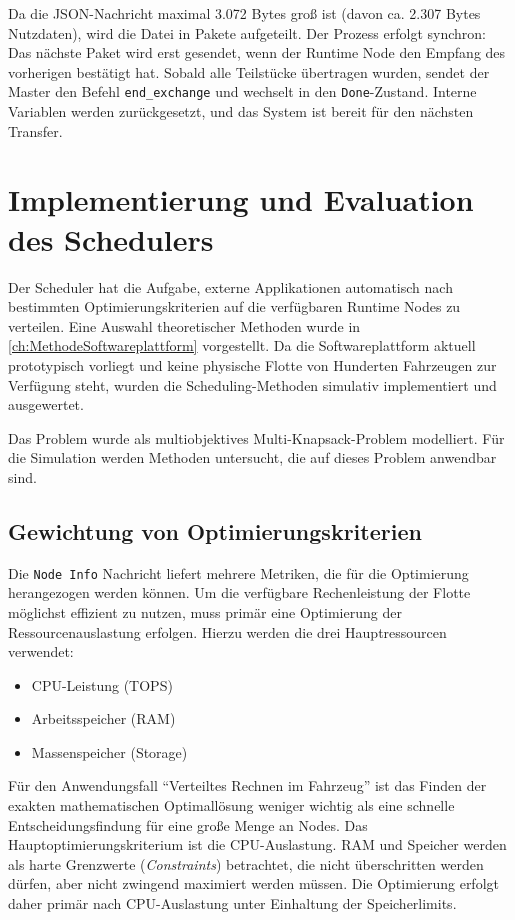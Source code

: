 Da die \gls{JSON}-Nachricht maximal 3.072 Bytes groß ist (davon ca. 2.307 Bytes Nutzdaten), wird die Datei in Pakete aufgeteilt. Der Prozess erfolgt synchron: Das nächste Paket wird erst gesendet, wenn der Runtime Node den Empfang des vorherigen bestätigt hat. Sobald alle Teilstücke übertragen wurden, sendet der Master den Befehl \texttt{end\_exchange} und wechselt in den \texttt{Done}-Zustand. Interne Variablen werden zurückgesetzt, und das System ist bereit für den nächsten Transfer.

\section{Implementierung und Evaluation des Schedulers}
\label{sec:ImplementierungScheduler}

Der Scheduler hat die Aufgabe, externe Applikationen automatisch nach bestimmten Optimierungskriterien auf die verfügbaren Runtime Nodes zu verteilen. Eine Auswahl theoretischer Methoden wurde in \autoref{ch:MethodeSoftwareplattform} vorgestellt. Da die Softwareplattform aktuell prototypisch vorliegt und keine physische Flotte von Hunderten Fahrzeugen zur Verfügung steht, wurden die Scheduling-Methoden simulativ implementiert und ausgewertet.

Das Problem wurde als multiobjektives Multi-Knapsack-Problem modelliert. Für die Simulation werden Methoden untersucht, die auf dieses Problem anwendbar sind.

\subsection{Gewichtung von Optimierungskriterien}
Die \texttt{Node Info} Nachricht liefert mehrere Metriken, die für die Optimierung herangezogen werden können. Um die verfügbare Rechenleistung der Flotte möglichst effizient zu nutzen, muss primär eine Optimierung der Ressourcenauslastung erfolgen. Hierzu werden die drei Hauptressourcen verwendet:
\begin{itemize}
    \item CPU-Leistung (TOPS)
    \item Arbeitsspeicher (RAM)
    \item Massenspeicher (Storage)
\end{itemize}

Für den Anwendungsfall \enquote{Verteiltes Rechnen im Fahrzeug} ist das Finden der exakten mathematischen Optimallösung weniger wichtig als eine schnelle Entscheidungsfindung für eine große Menge an Nodes. Das Hauptoptimierungskriterium ist die CPU-Auslastung. RAM und Speicher werden als harte Grenzwerte (\textit{Constraints}) betrachtet, die nicht überschritten werden dürfen, aber nicht zwingend maximiert werden müssen. Die Optimierung erfolgt daher primär nach CPU-Auslastung unter Einhaltung der Speicherlimits.


